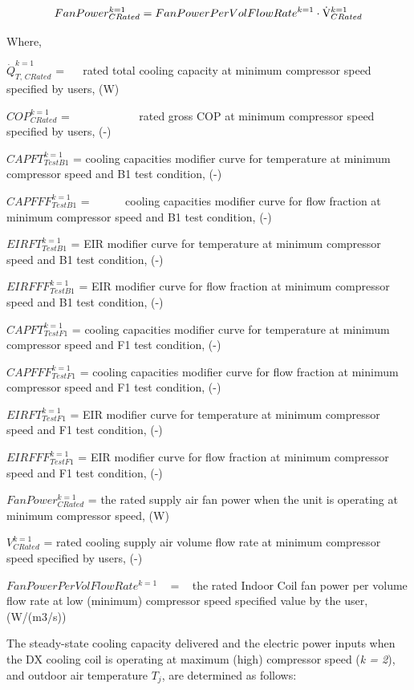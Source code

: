 \begin{equation}
FanPower_{CRated}^{k = 1} = FanPowerPerVolFlowRat{e^{k = 1}} \cdot {\rm{\dot V}}_{CRated}^{k = 1}
\end{equation}

Where,

\(\dot Q_{T,\,CRated}^{k = 1}\) = ~~ rated total cooling capacity at minimum compressor speed specified by users, (W)

\(COP_{CRated}^{k = 1}\) = ~~~~~~~~~~~ rated gross COP at minimum compressor speed specified by users, (-)

\(CAPFT_{TestB1}^{k = 1}\) = cooling capacities modifier curve for temperature at minimum compressor speed and B1 test condition, (-)

\(CAPFFF_{TestB1}^{k = 1}\) = ~~~~~ cooling capacities modifier curve for flow fraction at minimum compressor speed and B1 test condition, (-)

\(EIRFT_{TestB1}^{k = 1}\) = EIR modifier curve for temperature at minimum compressor speed and B1 test condition, (-)

\(EIRFFF_{TestB1}^{k = 1}\) = EIR modifier curve for flow fraction at minimum compressor speed and B1 test condition, (-)

\(CAPFT_{TestF1}^{k = 1}\) = cooling capacities modifier curve for temperature at minimum compressor speed and F1 test condition, (-)

\(CAPFFF_{TestF1}^{k = 1}\) = cooling capacities modifier curve for flow fraction at minimum compressor speed and F1 test condition, (-)

\(EIRFT_{TestF1}^{k = 1}\) = EIR modifier curve for temperature at minimum compressor speed and F1 test condition, (-)

\(EIRFFF_{TestF1}^{k = 1}\) = EIR modifier curve for flow fraction at minimum compressor speed and F1 test condition, (-)

\(FanPower_{CRated}^{k = 1}\) = the rated supply air fan power when the unit is operating at minimum compressor speed, (W)

\(V_{CRated}^{k = 1}\) = rated cooling supply air volume flow rate at minimum compressor speed specified by users, (-)

\(FanPowerPerVolFlowRat{e^{k = 1}}\) ~ = ~ the rated Indoor Coil fan power per volume flow rate at low (minimum) compressor speed specified value by the user, (W/(m3/s))

The steady-state cooling capacity delivered and the electric power inputs when the DX cooling coil is operating at maximum (high) compressor speed (\emph{k = 2}), and outdoor air temperature \(T_{j}\), are determined as follows:

